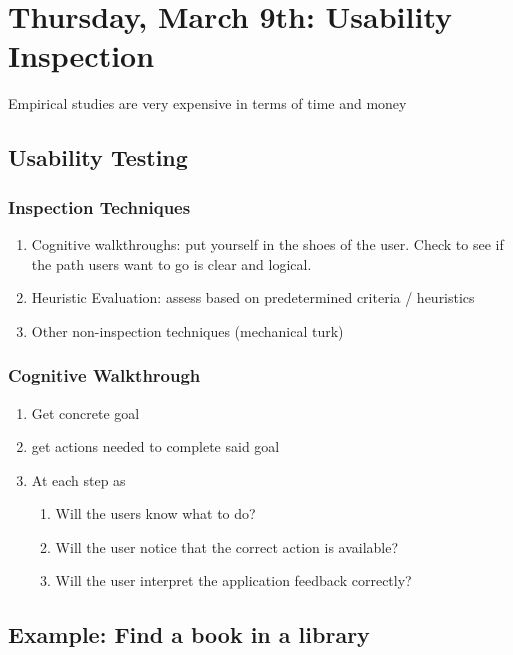 \section{Thursday, March 9th: Usability Inspection}
\begin{shaded}
Empirical studies are very expensive in terms of time and money
\end{shaded}
\subsection{Usability Testing}
    \subsubsection{Inspection Techniques}
    \begin{enumerate}
        \item Cognitive walkthroughs: put yourself in the shoes of the user. Check to see if the path users want to go is clear and logical. 
        
        \item Heuristic Evaluation: assess based on predetermined criteria / heuristics

        \item Other non-inspection techniques (mechanical turk)
    \end{enumerate}

    \subsubsection{Cognitive Walkthrough}
    \begin{enumerate}
        \item Get concrete goal
        \item get actions needed to complete said goal
        \item At each step as
        \begin{enumerate}
            \item Will the users know what to do?
            \item Will the user notice that the correct action is available?
            \item Will the user interpret the application feedback correctly?
        \end{enumerate}
    \end{enumerate}

    \subsection{Example: Find a book in a library}

